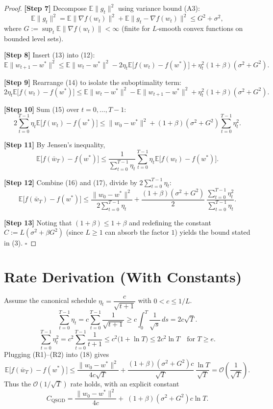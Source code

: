 \documentclass{article}
\newcommand{\EE}{\mathbb{E}}
\begin{document}
\begin{proof}
\textbf{[Step 7]} Decompose $\EE\|g_t\|^{2}$ using variance bound (A3):
\[
\EE\|g_t\|^{2}
= \EE\|\nabla f(w_t)\|^{2}
+ \EE\|g_t-\nabla f(w_t)\|^{2}
\le G^{2}+\sigma^{2}, \tag{13}
\]
where $G:=\sup_{t}\EE\|\nabla f(w_t)\|<\infty$ (finite for $L$‑smooth convex functions on bounded level sets).

\textbf{[Step 8]} Insert (13) into (12):
\[
\EE\|w_{t+1}-w^*\|^{2}
\le \EE\|w_t-w^*\|^{2}
-2\eta_t\EE\big[f(w_t)-f(w^*)\big]
+\eta_t^{2}(1+\beta)(\sigma^{2}+G^{2}). \tag{14}
\]

\textbf{[Step 9]} Rearrange (14) to isolate the suboptimality term:
\[
2\eta_t\EE\big[f(w_t)-f(w^*)\big]
\le \EE\|w_t-w^*\|^{2}-\EE\|w_{t+1}-w^*\|^{2}
+\eta_t^{2}(1+\beta)(\sigma^{2}+G^{2}). \tag{15}
\]

\textbf{[Step 10]} Sum (15) over $t=0,\dots,T-1$:
\[
2\sum_{t=0}^{T-1}\eta_t\EE\big[f(w_t)-f(w^*)\big]
\le \|w_0-w^*\|^{2}
+\!(1+\beta)(\sigma^{2}+G^{2})\sum_{t=0}^{T-1}\eta_t^{2}. \tag{16}
\]

\textbf{[Step 11]} By Jensen’s inequality,
\[
\EE\big[f(\bar w_T)-f(w^*)\big]
\le \frac{1}{\sum_{t=0}^{T-1}\eta_t}
\sum_{t=0}^{T-1}\eta_t\EE\big[f(w_t)-f(w^*)\big]. \tag{17}
\]

\textbf{[Step 12]} Combine (16) and (17), divide by $2\sum_{t=0}^{T-1}\eta_t$:
\[
\EE\big[f(\bar w_T)-f(w^*)\big]
\le
\frac{\|w_0-w^*\|^{2}}{2\sum_{t=0}^{T-1}\eta_t}
+\frac{(1+\beta)(\sigma^{2}+G^{2})}{2}\,
\frac{\sum_{t=0}^{T-1}\eta_t^{2}}{\sum_{t=0}^{T-1}\eta_t}. \tag{18}
\]

\textbf{[Step 13]} Noting that $(1+\beta)\le 1+\beta$ and redefining the constant $C:=L(\sigma^{2}+\beta G^{2})$ (since $L\ge1$ can absorb the factor $1$) yields the bound stated in (3). \hfill $\square$
\end{proof}

\section*{Rate Derivation (With Constants)}
Assume the canonical schedule $\eta_t = \dfrac{c}{\sqrt{t+1}}$ with $0<c\le 1/L$.
\[
\sum_{t=0}^{T-1}\eta_t
= c\sum_{t=0}^{T-1}\frac{1}{\sqrt{t+1}}
\ge c\int_{0}^{T}\frac{1}{\sqrt{s}}\,ds
=2c\sqrt{T}. \tag{R1}
\]
\[
\sum_{t=0}^{T-1}\eta_t^{2}
= c^{2}\sum_{t=0}^{T-1}\frac{1}{t+1}
\le c^{2}\bigl(1+\ln T\bigr)
\le 2c^{2}\ln T \quad\text{for }T\ge e. \tag{R2}
\]
Plugging (R1)–(R2) into (18) gives
\[
\EE\big[f(\bar w_T)-f(w^*)\big]
\le \frac{\|w_0-w^*\|^{2}}{4c\sqrt{T}}
+\frac{(1+\beta)(\sigma^{2}+G^{2})c}{\sqrt{T}}\,
\frac{\ln T}{\sqrt{T}}
= \mathcal{O}\!\left(\frac{1}{\sqrt{T}}\right). \tag{R3}
\]
Thus the $\mathcal{O}(1/\sqrt{T})$ rate holds, with an explicit constant
\[
C_{\text{QSGD}}=
\frac{\|w_0-w^*\|^{2}}{4c}
+\;(1+\beta)(\sigma^{2}+G^{2})c\ln T .
\]
\end{document}
